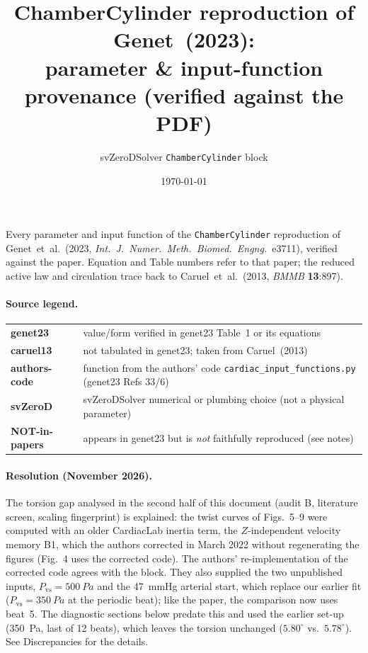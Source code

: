 \documentclass[10pt]{article}
\title{\textbf{ChamberCylinder reproduction of Genet~(2023):\\ parameter \& input-function provenance (verified against the PDF)}}
\author{svZeroDSolver \texttt{ChamberCylinder} block}
\date{\today}
\newcommand{\gen}{\textcolor{cgen}{\textbf{genet23}}}
\newcommand{\car}{\textcolor{ccar}{\textbf{caruel13}}}
\newcommand{\code}{\textcolor{ccode}{\textbf{authors-code}}}
\newcommand{\svz}{\textcolor{csvz}{\textbf{svZeroD}}}
\newcommand{\none}{\textcolor{cnone}{\textbf{NOT-in-papers}}}
\begin{document}
\maketitle

\noindent
Every parameter and input function of the \texttt{ChamberCylinder} reproduction of
Genet~et~al.~(2023, \emph{Int.\ J.\ Numer.\ Meth.\ Biomed.\ Engng.}\ e3711), verified
against the paper. Equation and Table numbers refer to that paper; the reduced
active law and circulation trace back to Caruel~et~al.~(2013, \emph{BMMB}
\textbf{13}:897).

\paragraph{Source legend.}
\begin{tabular}{ll}
\gen & value/form verified in genet23 Table~1 or its equations \\
\car & not tabulated in genet23; taken from Caruel~(2013) \\
\code & function from the authors' code \texttt{cardiac\_input\_functions.py} (genet23 Refs 33/6) \\
\svz & svZeroDSolver numerical or plumbing choice (not a physical parameter) \\
\none & appears in genet23 but is \emph{not} faithfully reproduced (see notes) \\
\end{tabular}

\paragraph{Resolution (November 2026).} The torsion gap analysed in the second half of this
document (audit B, literature screen, scaling fingerprint) is explained: the twist curves of
Figs.~5--9 were computed with an older CardiacLab inertia term, the $Z$-independent velocity
memory B1, which the authors corrected in March 2022 without regenerating the figures (Fig.~4
uses the corrected code). The authors' re-implementation of the corrected code agrees with the
block. They also supplied the two unpublished inputs, $P_\text{vs}=\SI{500}{Pa}$ and the
\SI{47}{mmHg} arterial start, which replace our earlier fit ($P_\text{vs}=\SI{350}{Pa}$ at the
periodic beat); like the paper, the comparison now uses beat~5. The diagnostic sections below
predate this and used the earlier set-up (\SI{350}{Pa}, last of 12 beats), which leaves the
torsion unchanged ($5.80^\circ$ vs.\ $5.78^\circ$). See Discrepancies for the details.
\end{document}
